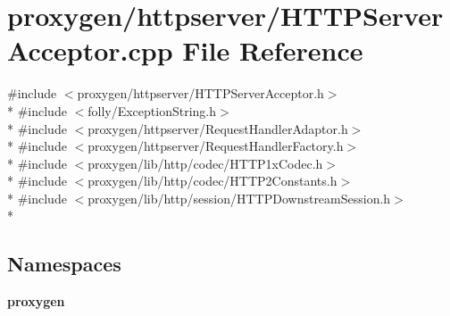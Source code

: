 \section{proxygen/httpserver/\+H\+T\+T\+P\+Server\+Acceptor.cpp File Reference}
\label{HTTPServerAcceptor_8cpp}
{\ttfamily \#include $<$proxygen/httpserver/\+H\+T\+T\+P\+Server\+Acceptor.\+h$>$}\\*
{\ttfamily \#include $<$folly/\+Exception\+String.\+h$>$}\\*
{\ttfamily \#include $<$proxygen/httpserver/\+Request\+Handler\+Adaptor.\+h$>$}\\*
{\ttfamily \#include $<$proxygen/httpserver/\+Request\+Handler\+Factory.\+h$>$}\\*
{\ttfamily \#include $<$proxygen/lib/http/codec/\+H\+T\+T\+P1x\+Codec.\+h$>$}\\*
{\ttfamily \#include $<$proxygen/lib/http/codec/\+H\+T\+T\+P2\+Constants.\+h$>$}\\*
{\ttfamily \#include $<$proxygen/lib/http/session/\+H\+T\+T\+P\+Downstream\+Session.\+h$>$}\\*
\subsection*{Namespaces}
\begin{DoxyCompactItemize}
\item 
 {\bf proxygen}
\end{DoxyCompactItemize}
